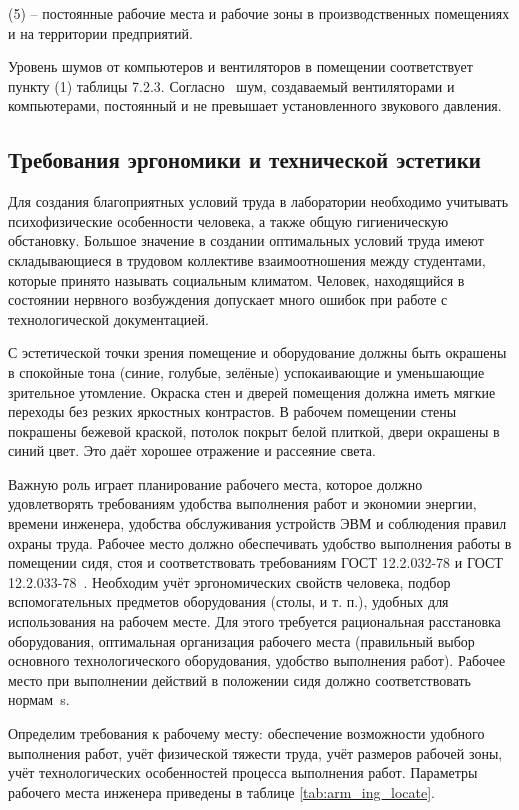 (5) – постоянные рабочие места и рабочие зоны в производственных помещениях и на территории предприятий.

Уровень шумов от компьютеров и вентиляторов в помещении соответствует пункту (1) таблицы 7.2.3. Согласно~\cite{gost_sec_ergo_33} шум, создаваемый вентиляторами и компьютерами, постоянный и не превышает установленного звукового давления.

\subsection{Требования эргономики и технической эстетики}
Для создания благоприятных условий труда в лаборатории необходимо учитывать психофизические особенности человека, а также общую гигиеническую обстановку. Большое значение в создании оптимальных условий труда имеют складывающиеся в трудовом коллективе взаимоотношения между студентами, которые принято называть социальным климатом. Человек, находящийся в состоянии нервного возбуждения допускает много ошибок при работе с технологической документацией.

С эстетической точки зрения помещение и оборудование должны быть окрашены в спокойные тона (синие, голубые, зелёные) успокаивающие и уменьшающие зрительное утомление. Окраска стен и дверей помещения должна иметь мягкие переходы без резких яркостных контрастов. В рабочем помещении стены покрашены бежевой краской, потолок покрыт белой плиткой, двери окрашены в синий цвет. Это даёт хорошее отражение и рассеяние света.

Важную роль играет планирование рабочего места, которое должно удовлетворять требованиям удобства выполнения работ и экономии энергии, времени инженера, удобства обслуживания устройств ЭВМ и соблюдения правил охраны труда. Рабочее место должно обеспечивать удобство выполнения работы в помещении сидя, стоя и соответствовать требованиям ГОСТ 12.2.032-78\cite{gost_sec_ergonom_32} и ГОСТ 12.2.033-78~\cite{gost_sec_ergo_33}. Необходим учёт эргономических свойств человека, подбор вспомогательных предметов оборудования (столы, и т. п.), удобных для использования на рабочем месте. Для этого требуется рациональная расстановка оборудования, оптимальная организация рабочего места (правильный выбор основного технологического оборудования, удобство выполнения работ). Рабочее место при выполнении действий в положении сидя должно соответствовать нормам~\cite{gost_sec_ergonom_32}s.

Определим требования к рабочему месту: обеспечение возможности удобного выполнения работ, учёт физической тяжести труда, учёт размеров рабочей зоны, учёт технологических особенностей процесса выполнения работ. Параметры рабочего места инженера приведены в таблице \ref{tab:arm_ing_locate}.

